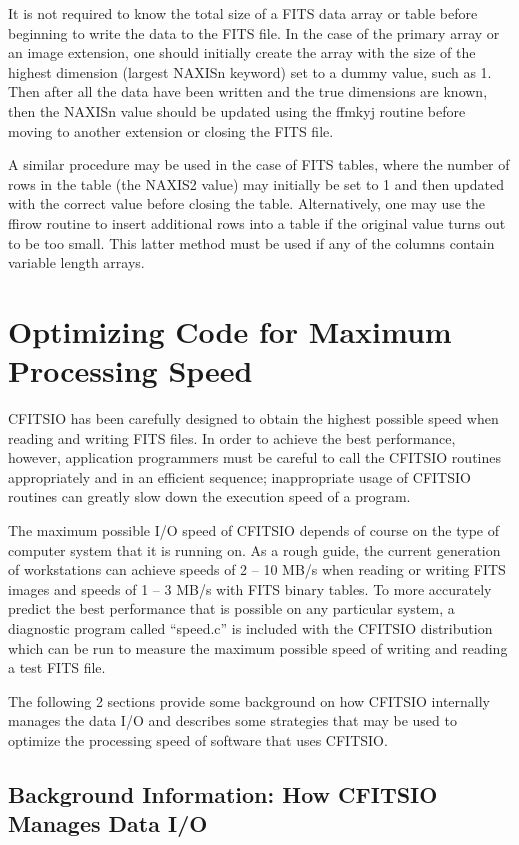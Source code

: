 It is not required to know the total size of a FITS data array or table
before beginning to write the data to the FITS file.  In the case of
the primary array or an image extension, one should initially create
the array with the size of the highest dimension (largest NAXISn
keyword) set to a dummy value, such as 1.  Then after all the data have
been written and the true dimensions are known, then the NAXISn value
should be updated using the ffmkyj routine before moving to another
extension or closing the FITS file.

A similar procedure may be used in the case of FITS tables, where the
number of rows in the table (the NAXIS2 value) may initially be set to
1 and then updated with the correct value before closing the table.
Alternatively, one may use the ffirow routine to insert additional rows
into a table if the original value turns out to be too small.  This
latter method must be used if any of the columns contain variable
length arrays.


\section{Optimizing Code for Maximum Processing Speed}

CFITSIO has been carefully designed to obtain the highest possible
speed when reading and writing FITS files.  In order to achieve the
best performance, however, application programmers must be careful to
call the CFITSIO routines appropriately and in an efficient sequence;
inappropriate usage of CFITSIO routines can greatly slow down the
execution speed of a program.

The maximum possible I/O speed of CFITSIO depends of course on the type
of computer system that it is running on.  As a rough guide, the
current generation of workstations can achieve speeds of 2 -- 10 MB/s
when reading or writing FITS images and speeds of 1 -- 3 MB/s with FITS
binary tables.  To more accurately predict the best performance that is
possible on any particular system, a diagnostic program called
``speed.c'' is included with the CFITSIO distribution which can be run
to measure the maximum possible speed of writing and reading a test
FITS file.

The following 2 sections provide some background on how CFITSIO
internally manages the data I/O and describes some strategies that may
be used to optimize the processing speed of software that uses
CFITSIO.


\subsection{Background Information: How CFITSIO Manages Data I/O}

